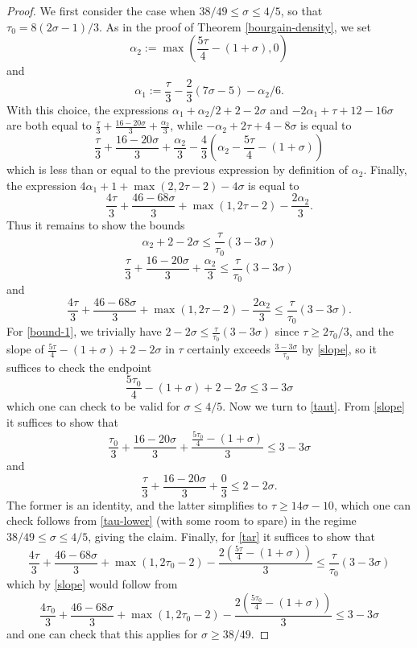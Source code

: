 \begin{proof}
We first consider the case when $38/49 \leq \sigma \leq 4/5$, so that $\tau_0 = 8(2\sigma-1)/3$.
As in the proof of Theorem \ref{bourgain-density}, we set
$$ \alpha_2 := \max\left( \frac{5\tau}{4} - (1+\sigma), 0\right)$$
and
$$ \alpha_1 := \frac{\tau}{3} - \frac{2}{3} (7\sigma-5) - \alpha_2/6.$$
With this choice, the expressions $\alpha_1+\alpha_2/2 + 2-2\sigma$ and $-2\alpha_1 + \tau + 12 - 16 \sigma$ are both equal to
$\frac{\tau}{3} + \frac{16-20\sigma}{3} + \frac{\alpha_2}{3}$, while $-\alpha_2 + 2\tau+4-8\sigma$ is equal to
$$ \frac{\tau}{3} + \frac{16-20\sigma}{3} + \frac{\alpha_2}{3} - \frac{4}{3} \left(\alpha_2 - \frac{5\tau}{4} - (1+\sigma)\right)$$
which is less than or equal to the previous expression by definition of $\alpha_2$.  Finally, the expression
$4\alpha_1 + 1+\max(2,2\tau-2)-4\sigma$ is equal to
$$ \frac{4\tau}{3} + \frac{46-68\sigma}{3} + \max(1,2\tau-2) - \frac{2\alpha_2}{3}.$$
Thus it remains to show the bounds
\begin{equation}\label{bound-1}
 \alpha_2 + 2 - 2 \sigma \leq \frac{\tau}{\tau_0} (3-3\sigma)
\end{equation}
\begin{equation}\label{taut}
    \frac{\tau}{3} + \frac{16-20\sigma}{3} + \frac{\alpha_2}{3} \leq \frac{\tau}{\tau_0} (3-3\sigma)
\end{equation}
and
\begin{equation}\label{tar}
    \frac{4\tau}{3} + \frac{46-68\sigma}{3}+ \max(1,2\tau-2) - \frac{2\alpha_2}{3} \leq \frac{\tau}{\tau_0} (3-3\sigma).
\end{equation}
For \eqref{bound-1}, we trivially have $2-2\sigma \leq \frac{\tau}{\tau_0}(3-3\sigma)$ since $\tau \geq 2\tau_0/3$, and the slope of $\frac{5\tau}{4} - (1+\sigma) + 2-2\sigma$ in $\tau$ certainly exceeds $\frac{3-3\sigma}{\tau_0}$ by \eqref{slope}, so it suffices to check the endpoint
$$ \frac{5\tau_0}{4} - (1+\sigma) + 2-2\sigma \leq 3-3\sigma$$
which one can check to be valid for $\sigma \leq 4/5$. Now we turn to \eqref{taut}.  From \eqref{slope} it suffices to show that
$$ \frac{\tau_0}{3} + \frac{16-20\sigma}{3} + \frac{\frac{5\tau_0}{4} - (1+\sigma)}{3} \leq 3 -3 \sigma$$
and
$$ \frac{\tau}{3} + \frac{16-20\sigma}{3} + \frac{0}{3} \leq 2 -2 \sigma.$$
The former is an identity, and the latter simplifies to $\tau \geq 14\sigma-10$, which one can check follows from \eqref{tau-lower} (with some room to spare) in the regime $38/49 \leq \sigma \leq 4/5$, giving the claim.  Finally, for \eqref{tar} it suffices to show that
$$ \frac{4\tau}{3} + \frac{46-68\sigma}{3}  + \max(1,2\tau_0-2) - \frac{2(\frac{5\tau}{4} - (1+\sigma))}{3} \leq \frac{\tau}{\tau_0} (3-3\sigma)$$
which by \eqref{slope} would follow from
$$ \frac{4\tau_0}{3} + \frac{46-68\sigma}{3} + \max(1,2\tau_0-2) - \frac{2(\frac{5\tau_0}{4} - (1+\sigma))}{3} \leq 3-3\sigma$$
and one can check that this applies for $\sigma \geq 38/49$.


\end{proof}
